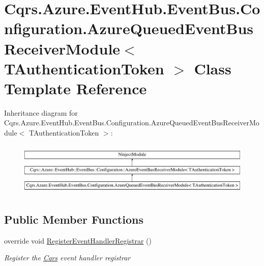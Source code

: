 \hypertarget{classCqrs_1_1Azure_1_1EventHub_1_1EventBus_1_1Configuration_1_1AzureQueuedEventBusReceiverModule}{}\section{Cqrs.\+Azure.\+Event\+Hub.\+Event\+Bus.\+Configuration.\+Azure\+Queued\+Event\+Bus\+Receiver\+Module$<$ T\+Authentication\+Token $>$ Class Template Reference}
\label{classCqrs_1_1Azure_1_1EventHub_1_1EventBus_1_1Configuration_1_1AzureQueuedEventBusReceiverModule}
Inheritance diagram for Cqrs.\+Azure.\+Event\+Hub.\+Event\+Bus.\+Configuration.\+Azure\+Queued\+Event\+Bus\+Receiver\+Module$<$ T\+Authentication\+Token $>$\+:\begin{figure}[H]
\begin{center}
\leavevmode
\includegraphics[height=2.568807cm]{classCqrs_1_1Azure_1_1EventHub_1_1EventBus_1_1Configuration_1_1AzureQueuedEventBusReceiverModule}
\end{center}
\end{figure}
\subsection*{Public Member Functions}
\begin{DoxyCompactItemize}
\item 
override void \hyperlink{classCqrs_1_1Azure_1_1EventHub_1_1EventBus_1_1Configuration_1_1AzureQueuedEventBusReceiverModule_a419dbe60e08be1bbf29b875cb1f121d0_a419dbe60e08be1bbf29b875cb1f121d0}{Register\+Event\+Handler\+Registrar} ()
\begin{DoxyCompactList}\small\item\em Register the \hyperlink{namespaceCqrs}{Cqrs} event handler registrar \end{DoxyCompactList}\end{DoxyCompactItemize}


